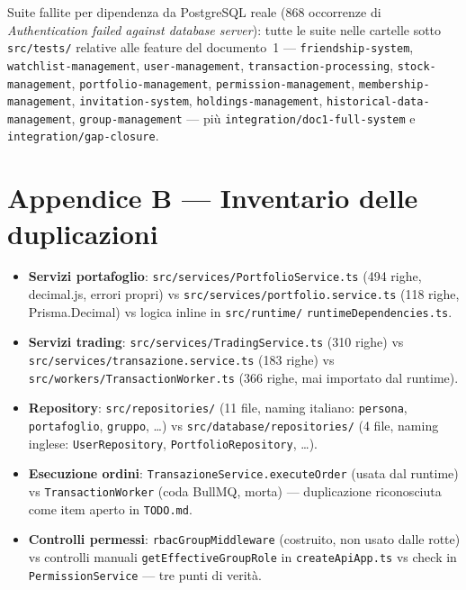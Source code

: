 \documentclass[11pt,a4paper]{article}
\newcommand{\file}[1]{\texttt{\small #1}}
\begin{document}
\begin{sloppypar}
Suite fallite per dipendenza da PostgreSQL reale (868 occorrenze di \emph{Authentication failed against database server}): tutte le suite nelle cartelle sotto \file{src/tests/} relative alle feature del documento~1 --- \file{friendship-system}, \file{watchlist-management}, \file{user-management}, \file{transaction-processing}, \file{stock-management}, \file{portfolio-management}, \file{permission-management}, \file{membership-management}, \file{invitation-system}, \file{holdings-management}, \file{historical-data-management}, \file{group-management} --- pi\`u \file{integration/doc1-full-system} e \file{integration/gap-closure}.
\end{sloppypar}

\section{Appendice B --- Inventario delle duplicazioni}

\begin{itemize}[leftmargin=1.5em,itemsep=2pt]
  \sloppy
  \item \textbf{Servizi portafoglio}: \file{src/services/PortfolioService.ts} (494 righe, decimal.js, errori propri) vs \file{src/services/portfolio.service.ts} (118 righe, Prisma.Decimal) vs logica inline in \file{src/runtime/} \file{runtimeDependencies.ts}.
  \item \textbf{Servizi trading}: \file{src/services/TradingService.ts} (310 righe) vs \file{src/services/transazione.service.ts} (183 righe) vs \file{src/workers/TransactionWorker.ts} (366 righe, mai importato dal runtime).
  \item \textbf{Repository}: \file{src/repositories/} (11 file, naming italiano: \file{persona}, \file{portafoglio}, \file{gruppo}, \dots) vs \file{src/database/repositories/} (4 file, naming inglese: \file{UserRepository}, \file{PortfolioRepository}, \dots).
  \item \textbf{Esecuzione ordini}: \file{TransazioneService.executeOrder} (usata dal runtime) vs \file{TransactionWorker} (coda BullMQ, morta) --- duplicazione riconosciuta come item aperto in \file{TODO.md}.
  \item \textbf{Controlli permessi}: \file{rbacGroupMiddleware} (costruito, non usato dalle rotte) vs controlli manuali \file{getEffectiveGroupRole} in \file{createApiApp.ts} vs check in \file{PermissionService} --- tre punti di verit\`a.
\end{itemize}
\end{document}
